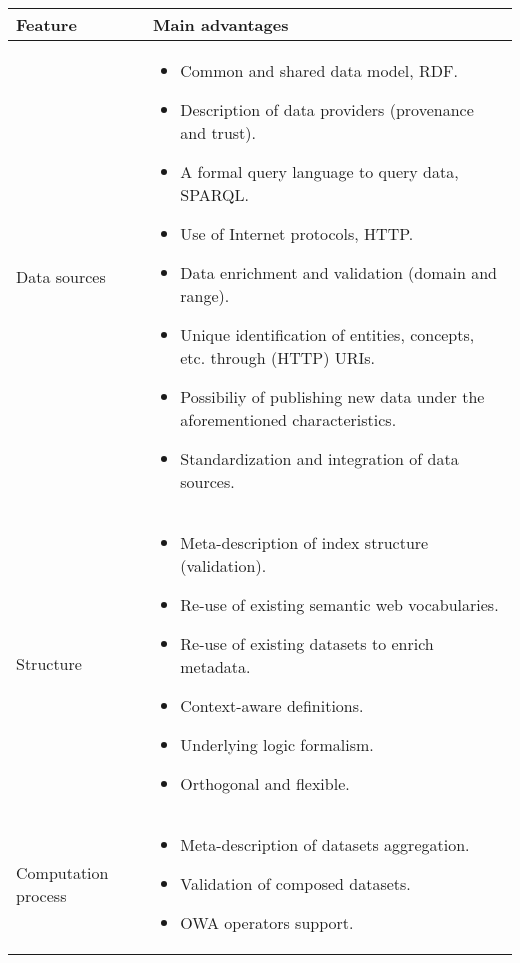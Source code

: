 \begin{table}[!htb]
\renewcommand{\arraystretch}{1.3}
\begin{center}
\begin{tabular}{|p{3cm}|p{8cm}|}
\hline
  \textbf{Feature} & \textbf{Main advantages}  \\  \hline
  Data sources & \begin{itemize}
                  \item Common and shared data model, RDF.
                  \item Description of data providers (provenance and trust).
                  \item A formal query language to query data, SPARQL.
                  \item Use of Internet protocols, HTTP.
                  \item Data enrichment and validation (domain and range).
                  \item Unique identification of entities, concepts, etc. through (HTTP) URIs.
                  \item Possibiliy of publishing new data under the aforementioned characteristics.
                  \item Standardization and integration of data sources.
                 \end{itemize} \\ \hline  
  Structure &  \begin{itemize}
                  \item Meta-description of index structure (validation).
                  \item Re-use of existing semantic web vocabularies.
                  \item Re-use of existing datasets to enrich metadata.
                  \item Context-aware definitions.
                  \item Underlying logic formalism.                  
                  \item Orthogonal and flexible.                 
                 \end{itemize} \\ \hline  
  Computation process &  \begin{itemize}
                  \item Meta-description of datasets aggregation.
                  \item Validation of composed datasets.
                  \item OWA operators support.

\end{itemize}
\end{tabular}
\end{center}
\end{table}
